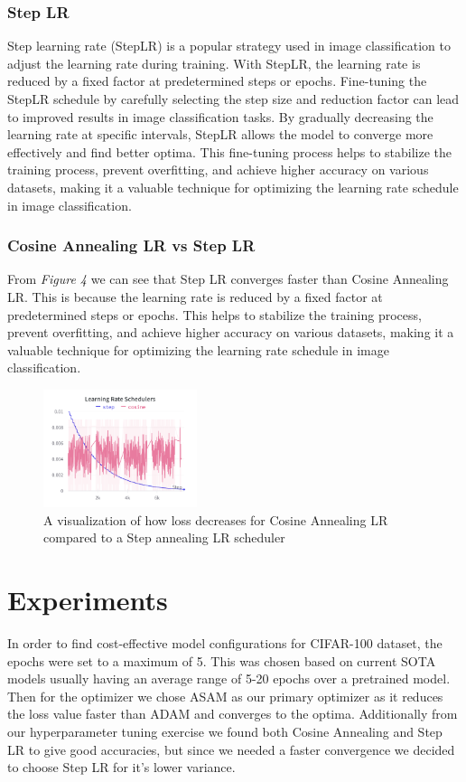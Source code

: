 \documentclass{article}
\begin{document}
\subsubsection{Step LR}
Step learning rate (StepLR) is a popular strategy used in image classification to adjust the learning rate during training.
With StepLR, the learning rate is reduced by a fixed factor at predetermined steps or epochs.
Fine-tuning the StepLR schedule by carefully selecting the step size and reduction factor can lead to improved results in image classification tasks.
By gradually decreasing the learning rate at specific intervals, StepLR allows the model to converge more effectively and find better optima.
This fine-tuning process helps to stabilize the training process, prevent overfitting, and achieve higher accuracy on various datasets, making it a valuable technique for optimizing the learning rate schedule in image classification.

\subsubsection{Cosine Annealing LR vs Step LR}
From \textit{Figure 4} we can see that Step LR converges faster than Cosine Annealing LR.
This is because the learning rate is reduced by a fixed factor at predetermined steps or epochs.
This helps to stabilize the training process, prevent overfitting, and achieve higher accuracy on various datasets, making it a valuable technique for optimizing the learning rate schedule in image classification.

\begin{figure}[ht]
    \vskip 0.2in
    \centering
    \includegraphics[width=0.4\textwidth]{learning_rate_schedulers.png}
    \caption{A visualization of how loss decreases for Cosine Annealing LR compared to a Step annealing LR scheduler}
    \label{fig:foobar}
    \vskip -0.2in
\end{figure}


\section{Experiments}
In order to find cost-effective model configurations for CIFAR-100 dataset, the epochs were set to a maximum of 5.
This was chosen based on current SOTA models usually having an average range of 5-20 epochs over a pretrained model.
Then for the optimizer we chose ASAM as our primary optimizer as it reduces the loss value faster than ADAM and converges to the optima.
Additionally from our hyperparameter tuning exercise we found both Cosine Annealing and Step LR to give good accuracies, but since we needed a faster convergence we decided to choose Step LR for it's lower variance.
\end{document}
